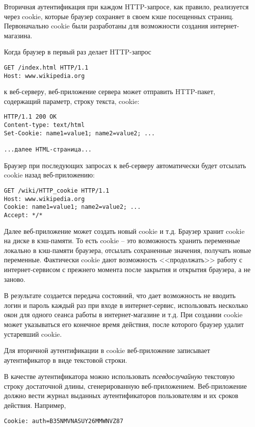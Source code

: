 Вторичная аутентификация при каждом HTTP-запросе, как правило, реализуется через cookie, которые браузер сохраняет в своем кэше посещенных страниц. Первоначально cookie были разработаны для возможности создания интернет-магазина.

Когда браузер в первый раз делает HTTP-запрос
\begin{center} \begin{verbatim}
GET /index.html HTTP/1.1
Host: www.wikipedia.org
\end{verbatim} \end{center}
к веб-серверу, веб-приложение сервера может отправить HTTP-пакет, содержащий параметр, строку текста, cookie:
\begin{center} \begin{verbatim}
HTTP/1.1 200 OK
Content-type: text/html
Set-Cookie: name1=value1; name2=value2; ...

...далее HTML-страница...
\end{verbatim} \end{center}
Браузер при последующих запросах к веб-серверу автоматически будет отсылать cookie назад веб-приложению:
\begin{center} \begin{verbatim}
GET /wiki/HTTP_cookie HTTP/1.1
Host: www.wikipedia.org
Cookie: name1=value1; name2=value2; ...
Accept: */*
\end{verbatim} \end{center}

Далее веб-приложение может создать новый cookie и т.д. Браузер хранит cookie на диске в кэш-памяти. То есть cookie -- это возможность хранить переменные локально в кэш-памяти браузера, отсылать сохраненные значения, получать новые переменные. Фактически cookie дают возможность <<продолжать>> работу с интернет-сервисом с прежнего момента после закрытия и открытия браузера, а не заново.

В результате создается передача состояний, что дает возможность не вводить логин и пароль каждый раз при входе в интернет-сервис, использовать несколько окон для одного сеанса работы в интернет-магазине и т.д. При создании cookie может указываться его конечное время действия, после которого браузер удалит устаревший cookie.

Для вторичной аутентификации в cookie веб-приложение записывает аутентификатор в виде текстовой строки.

В качестве аутентификатора можно использовать \emph{псевдослучайную} текстовую строку достаточной длины, сгенерированную веб-приложением. Веб-приложение должно вести журнал выданных аутентификаторов пользователям и их сроков действия. Например,
\begin{center} \begin{verbatim}
Cookie: auth=B35NMVNASUY26MMWNVZ87
\end{verbatim} \end{center}

